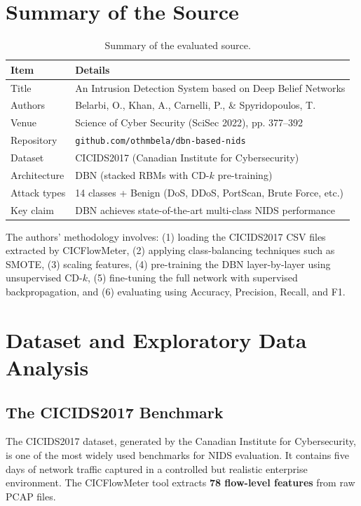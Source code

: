 \documentclass[11pt,a4paper]{article}
\begin{document}
\section{Summary of the Source}

\begin{table}[H]
\centering
\begin{tabular}{ll}
\toprule
\textbf{Item} & \textbf{Details} \\
\midrule
Title & An Intrusion Detection System based on Deep Belief Networks \\
Authors & Belarbi, O., Khan, A., Carnelli, P., \& Spyridopoulos, T. \\
Venue & Science of Cyber Security (SciSec 2022), pp. 377--392 \\
Repository & \texttt{github.com/othmbela/dbn-based-nids} \\
Dataset & CICIDS2017 (Canadian Institute for Cybersecurity) \\
Architecture & DBN (stacked RBMs with CD-$k$ pre-training) \\
Attack types & 14 classes + Benign (DoS, DDoS, PortScan, Brute Force, etc.) \\
Key claim & DBN achieves state-of-the-art multi-class NIDS performance \\
\bottomrule
\end{tabular}
\caption{Summary of the evaluated source.}
\end{table}

The authors' methodology involves: (1) loading the CICIDS2017 CSV files extracted by CICFlowMeter, (2) applying class-balancing techniques such as SMOTE, (3) scaling features, (4) pre-training the DBN layer-by-layer using unsupervised CD-$k$, (5) fine-tuning the full network with supervised backpropagation, and (6) evaluating using Accuracy, Precision, Recall, and F1.

\section{Dataset and Exploratory Data Analysis}

\subsection{The CICIDS2017 Benchmark}
The CICIDS2017 dataset, generated by the Canadian Institute for Cybersecurity, is one of the most widely used benchmarks for NIDS evaluation. It contains five days of network traffic captured in a controlled but realistic enterprise environment. The CICFlowMeter tool extracts \textbf{78 flow-level features} from raw PCAP files.
\end{document}

